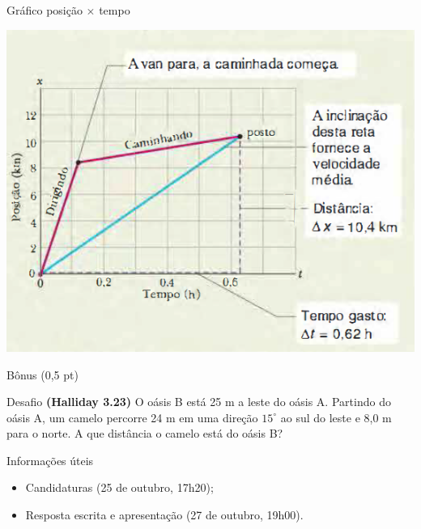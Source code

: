 \documentclass[xcolor=dvipsnames,table]{beamer}
\begin{document}
	\begin{frame}{Gráfico posição $\times$ tempo}
		\begin{center}
			\includegraphics[scale=0.5]{images/fig2-5}
		\end{center}
	\end{frame}
	
	\begin{frame}{Bônus (0,5 pt)}
		\begin{block}{Desafio}
			{\bf (Halliday 3.23)} O oásis B está 25 m a leste do oásis A. Partindo do oásis A, um camelo percorre 24 m em uma direção $15^{\circ}$ ao sul do leste e 8,0 m para o norte. A que distância o camelo está do oásis B?
		\end{block} \pause
		\begin{block}{Informações úteis}
			\begin{itemize}
                \item Candidaturas (25 de outubro, 17h20);
                \item Resposta escrita e apresentação (27 de outubro, 19h00).
			\end{itemize}
		\end{block} 
	\end{frame}
	
	\begin{frame}
		\titlepage
	\end{frame}
	
\end{document}
